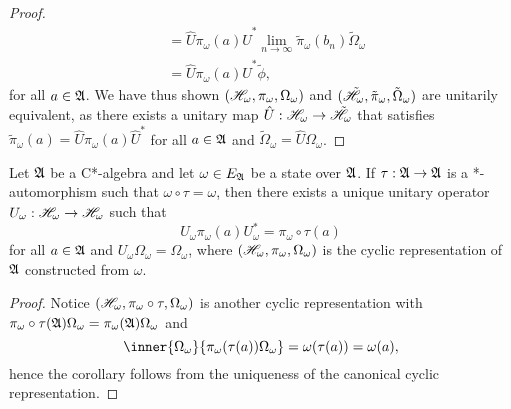 \begin{proof}
\begin{align*}
                                          &= \hat{U}\pi_\omega(a)\hat{U}^* \lim_{n\to\infty}{\tilde{\pi}_\omega(b_n)\tilde{\Omega}_\omega}\\
                                          &= \hat{U}\pi_\omega(a)\hat{U}^* \tilde{\phi},
    \end{align*}
    for all \(a \in \mathfrak{A}\). We have thus shown \((\mathscr{H}_\omega,\pi_\omega, \Omega_\omega)\) and \((\tilde{\mathscr{H}}_\omega, \tilde{\pi}_\omega, \tilde{\Omega}_\omega)\) are unitarily equivalent, as there exists a unitary map \(\hat{U} : \mathscr{H}_\omega \to \tilde{\mathscr{H}}_\omega\) that satisfies \(\tilde{\pi}_\omega(a) = \hat{U}\pi_\omega(a)\hat{U}^*\) for all \(a \in \mathfrak{A}\) and \(\tilde{\Omega}_\omega = \hat{U}\Omega_\omega\).
\end{proof}

\begin{corollary}
    Let \(\mathfrak{A}\) be a C*-algebra and let \(\omega \in E_{\mathfrak{A}}\) be a state over \(\mathfrak{A}\). If \(\tau : \mathfrak{A} \to \mathfrak{A}\) is a *-automorphism such that \(\omega \circ \tau = \omega\), then there exists a unique unitary operator \(U_\omega : \mathscr{H}_\omega \to \mathscr{H}_\omega\) such that
    \begin{equation*}
        U_\omega \pi_\omega(a) U_\omega^* = \pi_\omega\circ\tau(a)
    \end{equation*}
    for all \(a \in \mathfrak{A}\) and \(U_\omega\Omega_\omega = \Omega_\omega\), where \((\mathscr{H}_\omega, \pi_\omega, \Omega_\omega)\) is the cyclic representation of \(\mathfrak{A}\) constructed from \(\omega\).
\end{corollary}
\begin{proof}
    Notice \((\mathscr{H}_\omega, \pi_\omega \circ \tau, \Omega_\omega)\) is another cyclic representation with \(\pi_\omega \circ \tau(\mathfrak{A})\Omega_\omega = \pi_\omega(\mathfrak{A})\Omega_\omega\) and
    \begin{equation*}
        \inner{\Omega_\omega}{\pi_\omega(\tau(a)) \Omega_\omega} = \omega(\tau(a)) = \omega(a),
    \end{equation*}
    hence the corollary follows from the uniqueness of the canonical cyclic representation.
\end{proof}
